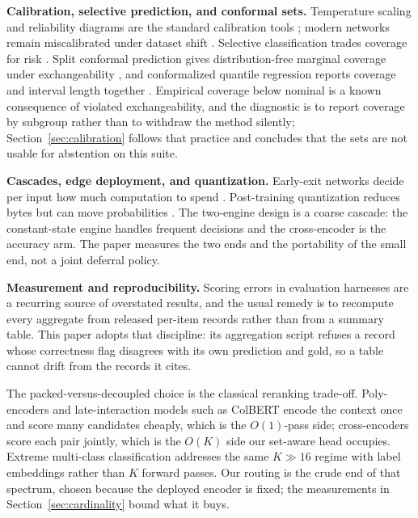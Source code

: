\textbf{Calibration, selective prediction, and conformal sets.}
Temperature scaling and reliability diagrams are the standard calibration tools
\cite{guo2017calibration}; modern networks remain miscalibrated under dataset shift
\cite{ovadia2019uncertainty}. Selective classification trades coverage for risk
\cite{geifman2017selective,geifman2019selectivenet}. Split conformal prediction gives
distribution-free marginal coverage under exchangeability
\cite{lei2018distribution,angelopoulos2021gentle}, and conformalized quantile regression reports
coverage and interval length together \cite{romano2019cqr}. Empirical coverage below nominal is a
known consequence of violated exchangeability, and the diagnostic is to report coverage by
subgroup rather than to withdraw the method silently; Section~\ref{sec:calibration} follows that
practice and concludes that the sets are not usable for abstention on this suite.

\textbf{Cascades, edge deployment, and quantization.}
Early-exit networks decide per input how much computation to spend
\cite{teerapittayanon2016branchynet,xin2020fastbert,zhou2020deebert}. Post-training quantization
reduces bytes but can move probabilities
\cite{dettmers2022llmint8,frantar2023gptq,xiao2023smoothquant}. The two-engine design is a coarse
cascade: the constant-state engine handles frequent decisions and the cross-encoder is the
accuracy arm. The paper measures the two ends and the portability of the small end, not a joint
deferral policy.

\textbf{Measurement and reproducibility.}
Scoring errors in evaluation harnesses are a recurring source of overstated results, and the
usual remedy is to recompute every aggregate from released per-item records rather than from a
summary table. This paper adopts that discipline: its aggregation script refuses a record whose
correctness flag disagrees with its own prediction and gold, so a table cannot drift from the
records it cites.

The packed-versus-decoupled choice is the classical reranking trade-off. Poly-encoders
\cite{humeau2020poly} and late-interaction models such as ColBERT \cite{khattab2020colbert} encode
the context once and score many candidates cheaply, which is the $O(1)$-pass side; cross-encoders
score each pair jointly, which is the $O(K)$ side our set-aware head occupies. Extreme
multi-class classification addresses the same $K\gg16$ regime with label embeddings rather than
$K$ forward passes. Our routing is the crude end of that spectrum, chosen because the deployed
encoder is fixed; the measurements in Section~\ref{sec:cardinality} bound what it buys.

